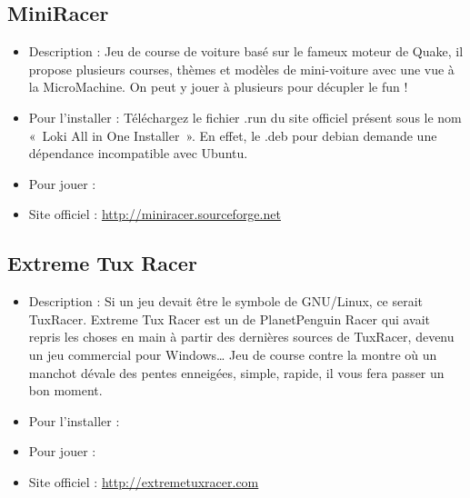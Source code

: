 \subsection{MiniRacer}
\begin{itemize}
\begingroup
{}
\item Description : Jeu de course de voiture basé sur le fameux moteur de Quake,  il propose plusieurs courses, thèmes et modèles de mini-voiture avec une vue à la MicroMachine. On peut y jouer à plusieurs pour décupler le fun !{\par}
\endgroup
\item Pour l'installer : Téléchargez le fichier .run du site officiel présent sous le nom «~Loki All in One Installer~». En effet, le .deb pour debian demande une dépendance incompatible avec Ubuntu.{\par}
\item Pour jouer : 
\item Site officiel : \url{http://miniracer.sourceforge.net}{\par}
\end{itemize}
\subsection{Extreme Tux Racer}
\begin{itemize}
\begingroup
{}
\item Description : Si un jeu devait être le symbole de GNU/\IndicCesure{}Linux, ce serait TuxRacer. Extreme Tux Racer est un  de PlanetPenguin Racer qui avait repris les choses en main à partir des dernières sources  de TuxRacer, devenu un jeu commercial pour Windows\ldots{} Jeu de course contre la montre où un manchot dévale des pentes enneigées, simple, rapide, il vous fera passer un bon moment.{\par}
\endgroup
\item Pour l'installer : 
\item Pour jouer : 
\item Site officiel : \url{http://extremetuxracer.com}{\par}
\end{itemize}

